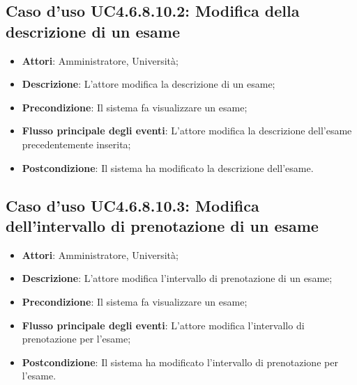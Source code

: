 \subsection{Caso d'uso \texorpdfstring{UC4.6.8.10.2}{UC4.6.8.10.2}: Modifica della descrizione di un esame}
\begin{itemize}
\item \textbf{Attori}: Amministratore, Università;
\item \textbf{Descrizione}: L'attore modifica la descrizione di un esame;

\item \textbf{Precondizione}: Il sistema fa visualizzare un esame;

\item \textbf{Flusso principale degli eventi}: L'attore modifica la descrizione dell’esame precedentemente inserita;

\item \textbf{Postcondizione}: Il sistema ha modificato la descrizione dell’esame.

\end{itemize}
\subsection{Caso d'uso \texorpdfstring{UC4.6.8.10.3}{UC4.6.8.10.3}: Modifica dell’intervallo di prenotazione di un esame}
\begin{itemize}
\item \textbf{Attori}: Amministratore, Università;
\item \textbf{Descrizione}: L'attore modifica l'intervallo di prenotazione di un esame;

\item \textbf{Precondizione}: Il sistema fa visualizzare un esame;

\item \textbf{Flusso principale degli eventi}: L'attore modifica l'intervallo di prenotazione per l’esame;

\item \textbf{Postcondizione}: Il sistema ha modificato l'intervallo di prenotazione per l’esame.

\end{itemize}
